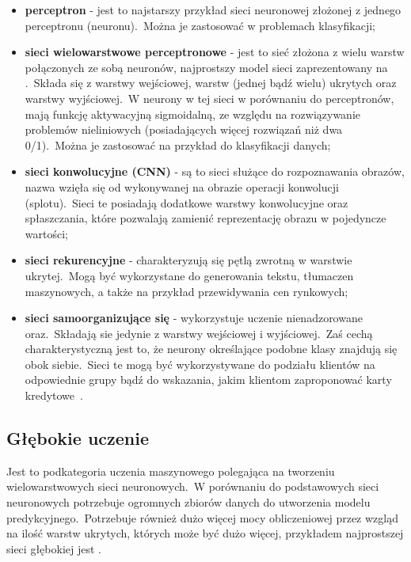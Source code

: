 \begin{itemize}
    \item \textbf{perceptron} - jest to najstarszy przykład sieci neuronowej złożonej z jednego perceptronu (neuronu).\ Można je zastosować w problemach klasyfikacji;
    \item \textbf{sieci wielowarstwowe perceptronowe} - jest to sieć złożona z wielu warstw połączonych ze sobą neuronów, najprostszy model sieci zaprezentowany na .\ Składa się z warstwy wejściowej, warstw (jednej bądź wielu) ukrytych oraz warstwy wyjściowej.\ W neurony w tej sieci w porównaniu do perceptronów, mają funkcję aktywacyjną sigmoidalną, ze względu na rozwiązywanie problemów nieliniowych (posiadających więcej rozwiązań niż dwa 0/1).\ Można je zastosować na przykład do klasyfikacji danych;
    \item \textbf{sieci konwolucyjne (CNN)} - są to sieci służące do rozpoznawania obrazów, nazwa wzięła się od wykonywanej na obrazie operacji konwolucji (splotu).\ Sieci te posiadają dodatkowe warstwy konwolucyjne oraz spłaszczania, które pozwalają zamienić reprezentację obrazu w pojedyncze wartości;
    \item \textbf{sieci rekurencyjne} - charakteryzują się pętlą zwrotną w warstwie ukrytej.\ Mogą być wykorzystane do generowania tekstu, tłumaczen maszynowych, a także na przykład przewidywania cen rynkowych;
    \item \textbf{sieci samoorganizujące się} - wykorzystuje uczenie nienadzorowane oraz.\ Składają sie jedynie z warstwy wejściowej i wyjściowej.\ Zaś cechą charakterystyczną jest to, że neurony określające podobne klasy znajdują się obok siebie.\ Sieci te mogą być wykorzystywane do podziału klientów na odpowiednie grupy bądź do wskazania, jakim klientom zaproponować karty kredytowe~\cite{IBMNetwork, BartosSOM}.
\end{itemize}

\subsection{Głębokie uczenie}
Jest to podkategoria uczenia maszynowego polegająca na tworzeniu wielowarstwowych sieci neuronowych.\ W porównaniu do podstawowych sieci neuronowych potrzebuje ogromnych zbiorów danych do utworzenia modelu predykcyjnego.\ Potrzebuje również dużo więcej mocy obliczeniowej przez wzgląd na ilość warstw ukrytych, których może być dużo więcej, przykładem najprostszej sieci głębokiej jest .

